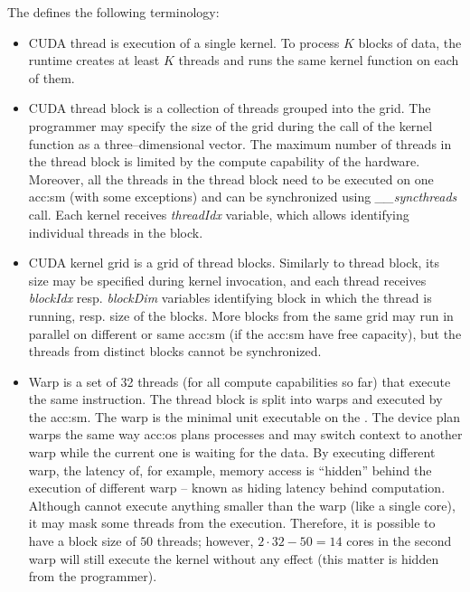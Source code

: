 The \cuda defines the following terminology:
\begin{itemize}
    \item CUDA thread is execution of a single kernel. To process $K$ blocks of data, the runtime creates at least $K$ threads and runs the same kernel function on each of them.
    \item CUDA thread block is a collection of threads grouped into the grid. The programmer may specify the size of the grid during the call of the kernel function as a three--dimensional vector. The maximum number of threads in the thread block is limited by the compute capability of the hardware. Moreover, all the threads in the thread block need to be executed on one \acrshort{acc:sm} (with some exceptions) and can be synchronized using \textit{\_\_syncthreads} call. Each kernel receives \textit{threadIdx} variable, which allows identifying individual threads in the block.
    \item CUDA kernel grid is a grid of thread blocks. Similarly to thread block, its size may be specified during kernel invocation, and each thread receives \textit{blockIdx} resp. \textit{blockDim} variables identifying block in which the thread is running, resp. size of the blocks. More blocks from the same grid may run in parallel on different or same \acrshort{acc:sm} (if the \acrshort{acc:sm} have free capacity), but the threads from distinct blocks cannot be synchronized.
    \item Warp is a set of 32 threads (for all compute capabilities so far) that execute the same instruction. The thread block is split into warps and executed by the \acrshort{acc:sm}. The warp is the minimal unit executable on the \gpu. The device plan warps the same way \acrshort{acc:os} plans processes and may switch context to another warp while the current one is waiting for the data. By executing different warp, the latency of, for example, memory access is \enquote{hidden} behind the execution of different warp -- known as hiding latency behind computation. Although \gpu cannot execute anything smaller than the warp (like a single core), it may mask some threads from the execution. Therefore, it is possible to have a block size of $50$ threads; however, $2\cdot32 - 50=14$ cores in the second warp will still execute the kernel without any effect (this matter is hidden from the programmer).
\end{itemize}

